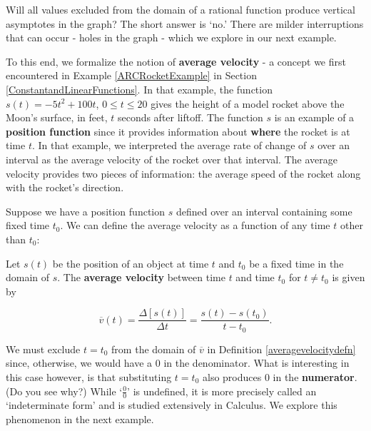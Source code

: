 \documentclass{ximera}
\begin{document}
Will all  values excluded from the domain of a rational function produce vertical asymptotes in the graph?  The short answer is `no.'  There are milder interruptions that can occur - holes in the graph - which we explore in our next example.  

To this end, we formalize the notion of \textbf{average velocity} - a concept we first encountered in  Example \ref{ARCRocketExample} in Section \ref{ConstantandLinearFunctions}. In that example, the function $s(t) = -5t^2+100t$, $0 \leq t \leq 20$ gives the height of a model rocket above the Moon's surface, in feet,  $t$ seconds after liftoff.  The function $s$ is an example of a \textbf{position function} since it provides information about \textbf{where} the rocket is at time $t$.   In that example, we interpreted the average rate of change of $s$ over an interval as the average velocity of the rocket over that interval.  The average velocity provides two pieces of information:  the average speed of the rocket along with the rocket's direction.  

Suppose we have a position function $s$ defined over an interval containing some fixed time $t_{0}$.  We can define the average velocity as a function of any time $t$ other than $t_{0}$:

\bigskip

\colorbox{ResultColor}{\bbm

\begin{defn} \label{averagevelocitydefn} Let $s(t)$ be the position of an object at time $t$ and $t_{0}$ be a fixed time in the domain of $s$.  The \textbf{average velocity} between time $t$ and time $t_{0}$  for $t \neq t_{0}$ is given by

\[ \overline{v}(t) = \dfrac{\Delta [s(t)]}{\Delta t} = \dfrac{s(t) - s(t_{0})}{t - t_{0}}. \]
\end{defn}

\ebm}

\bigskip

We must exclude $t = t_{0}$ from the domain of $\overline{v}$ in Definition \ref{averagevelocitydefn} since, otherwise, we would have a $0$ in the denominator.  What is interesting in this case however, is that substituting $t = t_{0}$ also produces $0$ in the \textbf{numerator}. (Do you see why?)  While `$\frac{0}{0}$' is undefined, it is more precisely called an `indeterminate form' and is studied extensively in Calculus.  We explore this phenomenon  in the next example.
\end{document}
